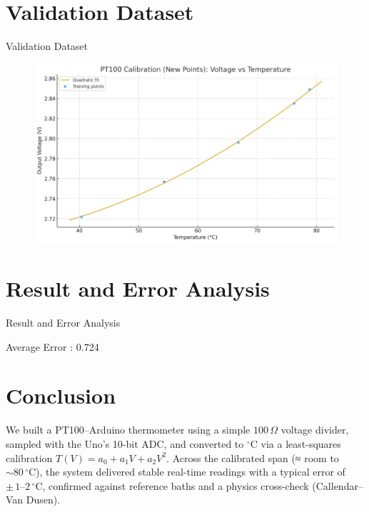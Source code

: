 \documentclass[journal]{IEEEtran}
\begin{document}
\section{Validation Dataset}
\FloatBarrier               %
\begin{table}[h]
  \centering
  \caption{Validation Dataset}
  \label{tab:validation-dataset}
\end{table}
\FloatBarrier               %
\begin{figure}[H]
  \centering
  \includegraphics[width=\columnwidth]{figs/valid.jpg}
\end{figure}

\section{Result and Error Analysis}
\begin{table}[h]
  \centering
  \caption{Result and Error Analysis}
  \label{tab:result-error}
\end{table}

Average Error : 0.724
\section{Conclusion}
We built a PT100–Arduino thermometer using a simple \(100\,\Omega\) voltage divider, sampled with the Uno’s 10-bit ADC, and converted to \(^{\circ}\mathrm{C}\) via a least-squares calibration
\(T(V)=a_{0}+a_{1}V+a_{2}V^{2}\).
Across the calibrated span (≈ room to \(\sim 80\,^{\circ}\mathrm{C}\)), the system delivered stable real-time readings with a typical error of \(\pm\,1\text{--}2\,^{\circ}\mathrm{C}\), confirmed against reference baths and a physics cross-check (Callendar–Van Dusen).
\end{document}
